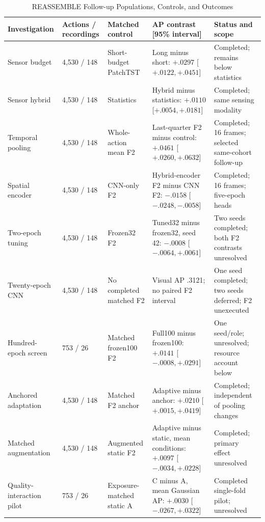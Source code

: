 \begin{table}[p]
\caption{REASSEMBLE Follow-up Populations, Controls, and Outcomes}
\label{tab:reassemble-followups}
\centering\footnotesize\setlength{\tabcolsep}{3pt}
\begin{tabularx}{\linewidth}{@{}P{.18\linewidth}P{.12\linewidth}YP{.27\linewidth}Y@{}}\toprule
Investigation & Actions / recordings & Matched control & AP contrast [95\% interval] & Status and scope\\\midrule
Sensor budget & 4,530 / 148 & Short-budget PatchTST & Long minus short: $+.0297$ [$+.0122,+.0451$] & Completed; remains below statistics\\\addlinespace
Sensor hybrid & 4,530 / 148 & Statistics & Hybrid minus statistics: $+.0110$ [$+.0054,+.0181$] & Completed; same sensing modality\\\addlinespace
Temporal pooling & 4,530 / 148 & Whole-action mean F2 & Last-quarter F2 minus control: $+.0461$ [$+.0260,+.0632$] & Completed; 16 frames; selected same-cohort follow-up\\\addlinespace
Spatial encoder & 4,530 / 148 & CNN-only F2 & Hybrid-encoder F2 minus CNN F2: $-.0158$ [$-.0248,-.0058$] & Completed; 16 frames; five-epoch heads\\\addlinespace
Two-epoch tuning & 4,530 / 148 & Frozen32 F2 & Tuned32 minus frozen32, seed 42: $-.0008$ [$-.0064,+.0061$] & Two seeds completed; both F2 contrasts unresolved\\\addlinespace
Twenty-epoch CNN & 4,530 / 148 & No completed matched F2 & Visual AP .3121; no paired F2 interval & One seed completed; two seeds deferred; F2 unexecuted\\\addlinespace
Hundred-epoch screen & 753 / 26 & Matched frozen100 F2 & Full100 minus frozen100: $+.0141$ [$-.0008,+.0291$] & One seed/role; unresolved; resource account below\\\addlinespace
Anchored adaptation & 4,530 / 148 & Matched F2 anchor & Adaptive minus anchor: $+.0210$ [$+.0015,+.0419$] & Completed; independent of pooling changes\\\addlinespace
Matched augmentation & 4,530 / 148 & Augmented static F2 & Adaptive minus static, mean conditions: $+.0097$ [$-.0034,+.0228$] & Completed; primary effect unresolved\\\addlinespace
Quality-interaction pilot & 753 / 26 & Exposure-matched static A & C minus A, mean Gaussian AP: $+.0030$ [$-.0267,+.0322$] & Completed single-fold pilot; unresolved\\\bottomrule
\end{tabularx}
\end{table}

